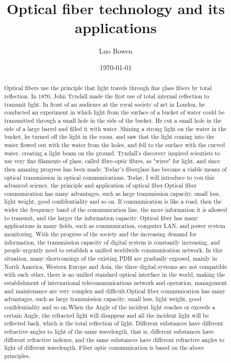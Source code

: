 \documentclass[a4paper]{article}
\begin{document}
\title{\textbf{\huge{Optical fiber technology and its applications}}}
\author{\textbf\large{Luo Bowen}}
\date{\today}
\maketitle
\begin{abstract}
Optical fibers use the principle that light travels through fine glass fibers by total reflection. In 1870, John Tyndall made the first use of total internal reflection to transmit light. In front of an audience at the royal society of art in London, he conducted an experiment in which light from the surface of a bucket of water could be transmitted through a small hole in the side of the bucket. He cut a small hole in the side of a large barrel and filled it with water. Shining a strong light on the water in the bucket, he turned off the light in the room, and saw that the light coming into the water flowed out with the water from the holes, and fell to the surface with the curved water, creating a light beam on the ground. Tyndall's discovery inspired scientists to use very fine filaments of glass, called fibre-optic fibres, as "wires" for light, and since then amazing progress has been made. Today's fiberglass has become a viable means of optical transmission in optical communications. Today, I will introduce to you this advanced science, the principle and application of optical fiber.Optical fiber communication has many advantages, such as large transmission capacity, small loss, light weight, good confidentiality and so on. If communication is like a road, then the wider the frequency band of the communication line, the more information it is allowed to transmit, and the larger the information capacity. Optical fiber has many applications in many fields, such as communication, computer LAN, and power system monitoring. With the progress of the society and the increasing demand for information, the transmission capacity of digital system is constantly increasing, and people urgently need to establish a unified worldwide communication network. In this situation, many shortcomings of the existing PDH are gradually exposed, mainly in North America, Western Europe and Asia, the three digital systems are not compatible with each other, there is no unified standard optical interface in the world, making the establishment of international telecommunications network and operation, management and maintenance are very complex and difficult.Optical fiber communication has many advantages, such as large transmission capacity, small loss, light weight, good confidentiality and so on.When the Angle of the incident light reaches or exceeds a certain Angle, the refracted light will disappear and all the incident light will be reflected back, which is the total reflection of light. Different substances have different refractive angles to light of the same wavelength, that is, different substances have different refractive indexes, and the same substances have different refractive angles to light of different wavelength. Fiber optic communication is based on the above principles.

\end{abstract}
\end{document}
